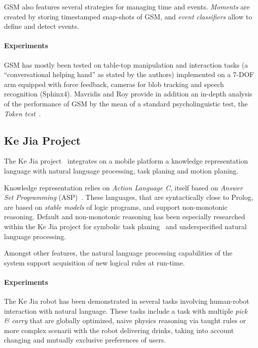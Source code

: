 GSM also features several strategies for managing time and events.
\emph{Moments} are created by storing timestamped snap-shots of GSM, and
\emph{event classifiers} allow to define and detect events.

\paragraph{Experiments} GSM has mostly been tested on table-top manipulation
and interaction tasks (a ``conversational helping hand'' as stated by the
authors) implemented on a 7-DOF arm equipped with force feedback, cameras for blob
tracking and speech recognition (Sphinx4). Mavridis and Roy provide in addition
an in-depth analysis of the performance of GSM by the mean of a standard
psycholinguistic test, the \emph{Token test}~\cite{DiSimoni1978}.

\subsection{Ke Jia Project}
\label{sect|kejia}

The Ke Jia project~\cite{Chen2010} integrates on a mobile platform a knowledge
representation language with natural language processing, task planing and
motion planing.

Knowledge representation relies on \emph{Action Language C}, itself based on
\emph{Answer Set Programming} (ASP)~\cite{Gelfond2008}. These languages, that
are syntactically close to Prolog, are based on \emph{stable models} of logic
programs, and support non-monotonic reasoning. Default and non-monotonic
reasoning has been especially researched within the Ke Jia project for symbolic
task planing~\cite{Ji2011} and underspecified natural language processing.

Amongst other features, the natural language processing capabilities of the
system support acquisition of new logical rules at run-time.

\paragraph{Experiments} The Ke Jia robot has been demonstrated in several tasks
involving human-robot interaction with natural language. These tasks include a
task with multiple \emph{pick \& carry} that are globally optimized, naive
physics reasoning via taught rules or more complex scenarii with the robot
delivering drinks, taking into account changing and mutually exclusive
preferences of users.


